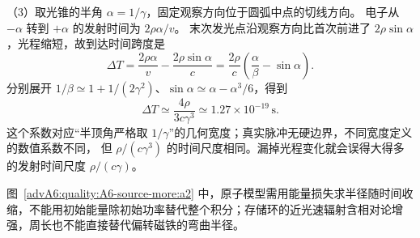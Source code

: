 \begin{advsolution}
（3）取光锥的半角 $\alpha=1/\gamma$，固定观察方向位于圆弧中点的切线方向。
电子从 $-\alpha$ 转到 $+\alpha$ 的发射时间为 $2\rho\alpha/v$。
末次发光点沿观察方向比首次前进了 $2\rho\sin\alpha$，光程缩短，故到达时间跨度是
\[
 \Delta T=\frac{2\rho\alpha}{v}-\frac{2\rho\sin\alpha}{c}
 =\frac{2\rho}{c}\left(\frac\alpha\beta-\sin\alpha\right).
\]
分别展开 $1/\beta\simeq1+1/(2\gamma^2)$、$\sin\alpha\simeq\alpha-\alpha^3/6$，得到
\[
 \boxed{\Delta T\simeq\frac{4\rho}{3c\gamma^3}
 \simeq1.27\times10^{-19}\,\mathrm s}.
\]
这个系数对应“半顶角严格取 $1/\gamma$”的几何宽度；真实脉冲无硬边界，不同宽度定义的数值系数不同，
但 $\rho/(c\gamma^3)$ 的时间尺度相同。漏掉光程变化就会误得大得多的发射时间尺度 $\rho/(c\gamma)$。

图~\ref{advA6:quality:A6-source-more:a2} 中，原子模型需用能量损失求半径随时间收缩，不能用初始能量除初始功率替代整个积分；存储环的近光速辐射含相对论增强，周长也不能直接替代偏转磁铁的弯曲半径。
\end{advsolution}


